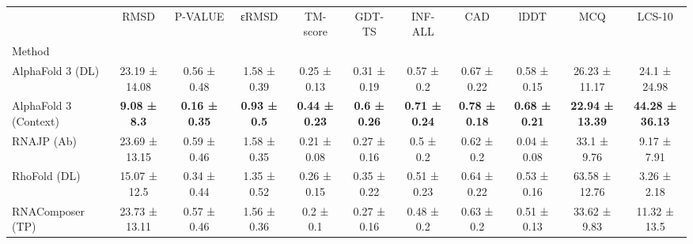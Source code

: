 \begin{tabular}{lcccccccccc}
\toprule
 & RMSD & P-VALUE & εRMSD & TM-score & GDT-TS & INF-ALL & CAD & lDDT & MCQ & LCS-10 \\
Method &  &  &  &  &  &  &  &  &  &  \\
\midrule
AlphaFold 3 (DL) & 23.19 ± 14.08 & 0.56 ± 0.48 & 1.58 ± 0.39 & 0.25 ± 0.13 & 0.31 ± 0.19 & 0.57 ± 0.2 & 0.67 ± 0.22 & 0.58 ± 0.15 & 26.23 ± 11.17 & 24.1 ± 24.98 \\
AlphaFold 3 (Context) & \textbf{9.08 ± 8.3} & \textbf{0.16 ± 0.35} & \textbf{0.93 ± 0.5} & \textbf{0.44 ± 0.23} & \textbf{0.6 ± 0.26} & \textbf{0.71 ± 0.24} & \textbf{0.78 ± 0.18} & \textbf{0.68 ± 0.21} & \textbf{22.94 ± 13.39} & \textbf{44.28 ± 36.13} \\
RNAJP (Ab) & 23.69 ± 13.15 & 0.59 ± 0.46 & 1.58 ± 0.35 & 0.21 ± 0.08 & 0.27 ± 0.16 & 0.5 ± 0.2 & 0.62 ± 0.2 & 0.04 ± 0.08 & 33.1 ± 9.76 & 9.17 ± 7.91 \\
RhoFold (DL) & 15.07 ± 12.5 & 0.34 ± 0.44 & 1.35 ± 0.52 & 0.26 ± 0.15 & 0.35 ± 0.22 & 0.51 ± 0.23 & 0.64 ± 0.22 & 0.53 ± 0.16 & 63.58 ± 12.76 & 3.26 ± 2.18 \\
RNAComposer (TP) & 23.73 ± 13.11 & 0.57 ± 0.46 & 1.56 ± 0.36 & 0.2 ± 0.1 & 0.27 ± 0.16 & 0.48 ± 0.2 & 0.63 ± 0.2 & 0.51 ± 0.13 & 33.62 ± 9.83 & 11.32 ± 13.5 \\
\bottomrule
\end{tabular}
